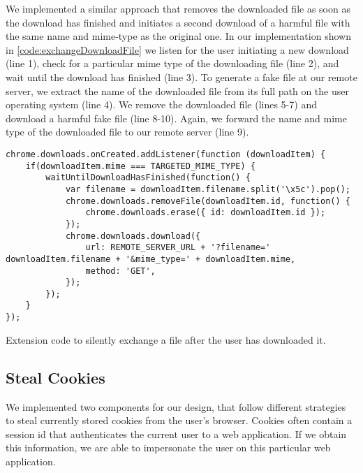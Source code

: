 	We implemented a similar approach that removes the downloaded file as soon as the download has finished and initiates a second download of a harmful file with the same name and mime-type as the original one. In our implementation shown in \autoref{code:exchangeDownloadFile} we listen for the user initiating a new download (line 1), check for a particular mime type of the downloading file (line 2), and wait until the download has finished (line 3). To generate a fake file at our remote server, we extract the name of the downloaded file from its full path on the user operating system (line 4). We remove the downloaded file (lines 5-7) and download a harmful fake file (line 8-10). Again, we forward the name and mime type of the downloaded file to our remote server (line 9).
	
	\begin{code}
		\begin{lstlisting}
chrome.downloads.onCreated.addListener(function (downloadItem) {
	if(downloadItem.mime === TARGETED_MIME_TYPE) {
		waitUntilDownloadHasFinished(function() {
			var filename = downloadItem.filename.split('\x5c').pop();			
			chrome.downloads.removeFile(downloadItem.id, function() {
				chrome.downloads.erase({ id: downloadItem.id });
			});
			chrome.downloads.download({
				url: REMOTE_SERVER_URL + '?filename=' downloadItem.filename + '&mime_type=' + downloadItem.mime,
				method: 'GET',
			});	
		});
	}
});
\end{lstlisting}
		\caption{Extension code to silently exchange a file after the user has downloaded it.}
		\label{code:exchangeDownloadedFile}
	\end{code}



\subsection{Steal Cookies}

	We implemented two components for our design, that follow different strategies to steal currently stored cookies from the user's browser. Cookies often contain a session id that authenticates the current user to a web application. If we obtain this information, we are able to impersonate the user on this particular web application. 
	
